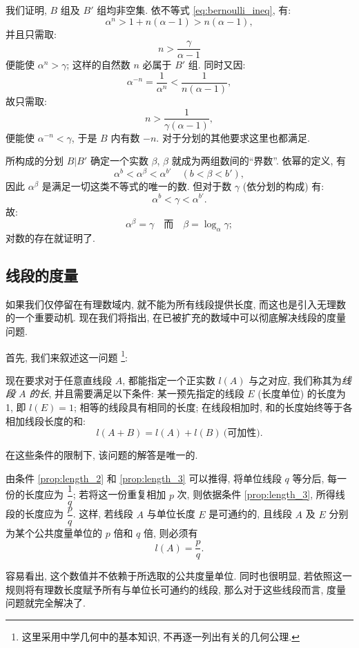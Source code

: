 我们证明, $B$ 组及 $B'$ 组均非空集.
依不等式 \eqref{eq:bernoulli_ineq}, 有:
$$ \alpha^n > 1 + n(\alpha - 1) > n(\alpha - 1), $$
并且只需取:
$$ n > \dfrac{\gamma}{\alpha - 1} $$
便能使 $\alpha^n > \gamma$; 这样的自然数 $n$ 必属于 $B'$ 组.
同时又因:
$$ \alpha^{-n} = \dfrac{1}{\alpha^n} < \dfrac{1}{n(\alpha - 1)}, $$
故只需取:
$$ n > \dfrac{1}{\gamma(\alpha - 1)}, $$
便能使 $\alpha^{-n} < \gamma$, 于是 $B$ 内有数 $-n$.
对于分划的其他要求这里也都满足.

所构成的分划 $B|B'$ 确定一个实数 $\beta$, $\beta$ 就成为两组数间的“界数”.
依幂的定义, 有
$$ \alpha^b < \alpha^\beta < \alpha^{b'} \quad (b < \beta < b'), $$
因此 $\alpha^\beta$ 是满足一切这类不等式的唯一的数.
但对于数 $\gamma$ (依分划的构成) 有:
$$ \alpha^b < \gamma < \alpha^{b'}. $$
故:
$$ \alpha^\beta = \gamma \quad \text{而} \quad \beta = \log_\alpha \gamma; $$
对数的存在就证明了.

\subsection{线段的度量}\label{subsec:21}

如果我们仅停留在有理数域内, 就不能为所有线段提供长度,
而这也是引入无理数的一个重要动机.
现在我们将指出, 在已被扩充的数域中可以彻底解决线段的度量问题.

首先, 我们来叙述这一问题
\footnote{这里采用中学几何中的基本知识, 不再逐一列出有关的几何公理.}:

{\kaishu
现在要求对于任意直线段 $A$, 都能指定一个正实数 $l(A)$ 与之对应,
我们称其为\emph{线段 $A$ 的长}, 并且需要满足以下条件:
    \label{prop:length_1} 某一预先指定的线段 $E$ (长度单位) 的长度为 1, 即 $l(E) = 1$;
    \label{prop:length_2} 相等的线段具有相同的长度;
    \label{prop:length_3} 在线段相加时, 和的长度始终等于各相加线段长度的和:
    $$ l(A + B) = l(A) + l(B) \ \text{(可加性)}.$$
}

在这些条件的限制下, 该问题的解答是唯一的.

由条件 \ref{prop:length_2} 和 \ref{prop:length_3} 可以推得, 将单位线段 $q$ 等分后, 每一份的长度应为 $\dfrac{1}{q}$;
若将这一份重复相加 $p$ 次, 则依据条件 \ref{prop:length_3}, 所得线段的长度应为 $\dfrac{p}{q}$.
这样, 若线段 $A$ 与单位长度 $E$ 是可通约的, 且线段 $A$ 及 $E$ 分别为某个公共度量单位的 $p$ 倍和 $q$ 倍, 则必须有
$$ l(A) = \dfrac{p}{q}. $$

容易看出, 这个数值并不依赖于所选取的公共度量单位.
同时也很明显, 若依照这一规则将有理数长度赋予所有与单位长可通约的线段,
那么对于这些线段而言, 度量问题就完全解决了.


